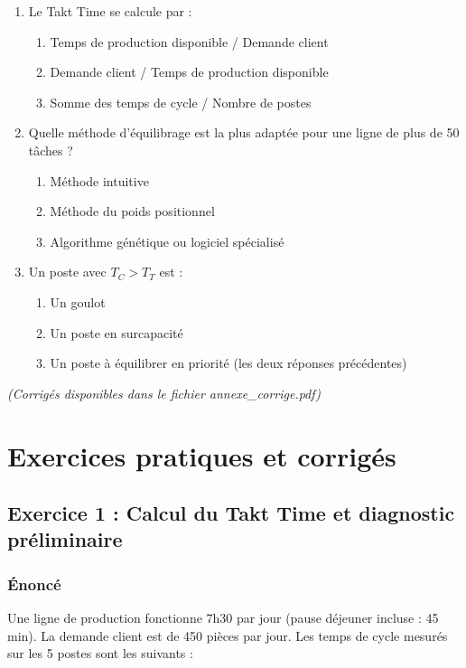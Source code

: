 \documentclass[12pt,a4paper]{article}
\begin{document}
\begin{center}
\begin{enumerate}
    \item Le Takt Time se calcule par : 
    \begin{enumerate}
        \item Temps de production disponible / Demande client
        \item Demande client / Temps de production disponible
        \item Somme des temps de cycle / Nombre de postes
    \end{enumerate}
    \item Quelle méthode d’équilibrage est la plus adaptée pour une ligne de plus de 50 tâches ?
    \begin{enumerate}
        \item Méthode intuitive
        \item Méthode du poids positionnel
        \item Algorithme génétique ou logiciel spécialisé
    \end{enumerate}
    \item Un poste avec \(T_C > T_T\) est :
    \begin{enumerate}
        \item Un goulot
        \item Un poste en surcapacité
        \item Un poste à équilibrer en priorité (les deux réponses précédentes)
    \end{enumerate}
\end{enumerate}
\textit{(Corrigés disponibles dans le fichier annexe\_corrige.pdf)}


\section{Exercices pratiques et corrigés}

\subsection{Exercice 1 : Calcul du Takt Time et diagnostic préliminaire}
\subsubsection{Énoncé}
Une ligne de production fonctionne 7h30 par jour (pause déjeuner incluse : 45 min). La demande client est de 450 pièces par jour. Les temps de cycle mesurés sur les 5 postes sont les suivants :


\end{center}
\end{document}
